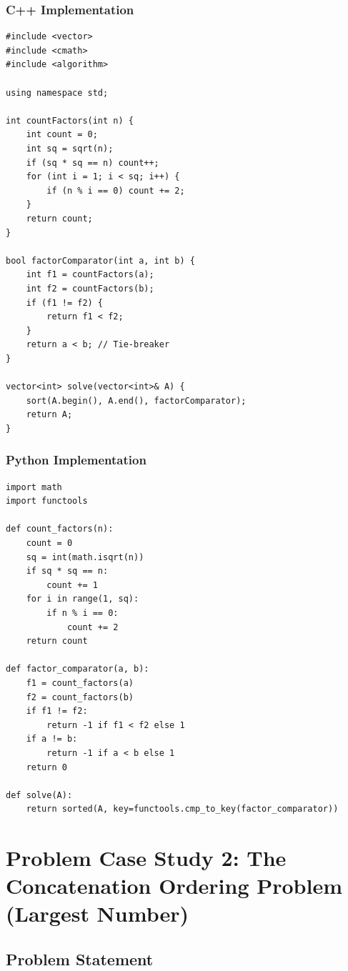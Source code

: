 \documentclass[10pt,journal,compsoc,onecolumn]{IEEEtran}
\begin{document}
\subsubsection{C++ Implementation}
\begin{verbatim}
#include <vector>
#include <cmath>
#include <algorithm>

using namespace std;

int countFactors(int n) {
    int count = 0;
    int sq = sqrt(n);
    if (sq * sq == n) count++;
    for (int i = 1; i < sq; i++) {
        if (n % i == 0) count += 2;
    }
    return count;
}

bool factorComparator(int a, int b) {
    int f1 = countFactors(a);
    int f2 = countFactors(b);
    if (f1 != f2) {
        return f1 < f2;
    }
    return a < b; // Tie-breaker
}

vector<int> solve(vector<int>& A) {
    sort(A.begin(), A.end(), factorComparator);
    return A;
}
\end{verbatim}

\subsubsection{Python Implementation}
\begin{verbatim}
import math
import functools

def count_factors(n):
    count = 0
    sq = int(math.isqrt(n))
    if sq * sq == n:
        count += 1
    for i in range(1, sq):
        if n % i == 0:
            count += 2
    return count

def factor_comparator(a, b):
    f1 = count_factors(a)
    f2 = count_factors(b)
    if f1 != f2:
        return -1 if f1 < f2 else 1
    if a != b:
        return -1 if a < b else 1
    return 0

def solve(A):
    return sorted(A, key=functools.cmp_to_key(factor_comparator))
\end{verbatim}

\section{Problem Case Study 2: The Concatenation Ordering Problem (Largest Number)}
\label{sec:largest_number}

\subsection{Problem Statement}
\end{document}
